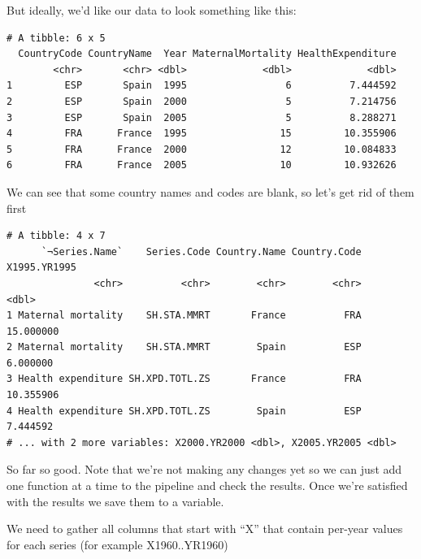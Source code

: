 \documentclass[]{article}
\newenvironment{Shaded}{\begin{snugshade}}{\end{snugshade}}
\newcommand{\KeywordTok}[1]{\textcolor[rgb]{0.13,0.29,0.53}{\textbf{{#1}}}}
\newcommand{\StringTok}[1]{\textcolor[rgb]{0.31,0.60,0.02}{{#1}}}
\newcommand{\NormalTok}[1]{{#1}}
\theoremstyle{definition}
\theoremstyle{definition}
\theoremstyle{definition}
\theoremstyle{remark}
\begin{document}
But ideally, we'd like our data to look something like this:

\begin{verbatim}
# A tibble: 6 x 5
  CountryCode CountryName  Year MaternalMortality HealthExpenditure
        <chr>       <chr> <dbl>             <dbl>             <dbl>
1         ESP       Spain  1995                 6          7.444592
2         ESP       Spain  2000                 5          7.214756
3         ESP       Spain  2005                 5          8.288271
4         FRA      France  1995                15         10.355906
5         FRA      France  2000                12         10.084833
6         FRA      France  2005                10         10.932626
\end{verbatim}

We can see that some country names and codes are blank, so let's get rid
of them first

\begin{Shaded}
\end{Shaded}

\begin{verbatim}
# A tibble: 4 x 7
      `¬Series.Name`    Series.Code Country.Name Country.Code X1995.YR1995
               <chr>          <chr>        <chr>        <chr>        <dbl>
1 Maternal mortality    SH.STA.MMRT       France          FRA    15.000000
2 Maternal mortality    SH.STA.MMRT        Spain          ESP     6.000000
3 Health expenditure SH.XPD.TOTL.ZS       France          FRA    10.355906
4 Health expenditure SH.XPD.TOTL.ZS        Spain          ESP     7.444592
# ... with 2 more variables: X2000.YR2000 <dbl>, X2005.YR2005 <dbl>
\end{verbatim}

So far so good. Note that we're not making any changes yet so we can
just add one function at a time to the pipeline and check the results.
Once we're satisfied with the results we save them to a variable.

We need to gather all columns that start with ``X'' that contain
per-year values for each series (for example X1960..YR1960)

\begin{Shaded}
\end{Shaded}
\end{document}
